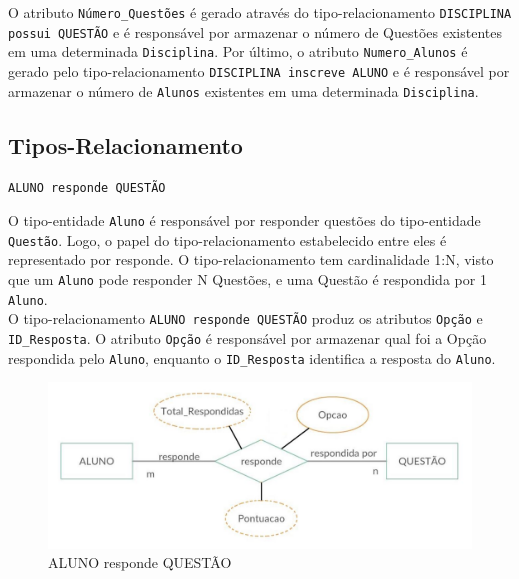 \documentclass[12pt,a4paper]{article}
\begin{document}
O atributo \texttt{Número\_Questões} é gerado através do tipo-relacionamento \texttt{DISCIPLINA possui QUESTÃO} e é responsável por armazenar o número de Questões existentes em uma determinada \texttt{Disciplina}. Por último, o atributo \texttt{Numero\_Alunos} é gerado pelo tipo-relacionamento \texttt{DISCIPLINA inscreve ALUNO} e é responsável por armazenar o número de \texttt{Alunos} existentes em uma determinada \texttt{Disciplina}.\\

\subsection{Tipos-Relacionamento}

\vspace{0.5cm}
\begin{center}
    \texttt{{ALUNO \texttt{responde} QUESTÃO}}
\end{center}

O tipo-entidade {\texttt{Aluno}} é responsável por responder questões do tipo-entidade \texttt{Questão}. Logo, o papel do tipo-relacionamento estabelecido entre eles é representado por responde. O tipo-relacionamento tem cardinalidade 1:N, visto que um \texttt{Aluno} pode responder N Questões, e uma Questão é respondida por 1 \texttt{Aluno}.\\

O tipo-relacionamento \texttt{{ALUNO responde QUESTÃO}} produz os atributos \texttt{Opção} e \texttt{ID\_Resposta}. O atributo \texttt{Opção} é responsável por armazenar qual foi a Opção respondida pelo \texttt{Aluno}, enquanto o \texttt{ID\_Resposta} identifica a resposta do \texttt{Aluno}.

\begin{center}
\centering
\begin{figure}[h]
    \centering
    \includegraphics[width=\linewidth]{alunoQuestao.jpg}
    \caption{ALUNO responde QUESTÃO}
    \label{fig:alunoQuestao}
\end{figure}
\end{center}
\end{document}
